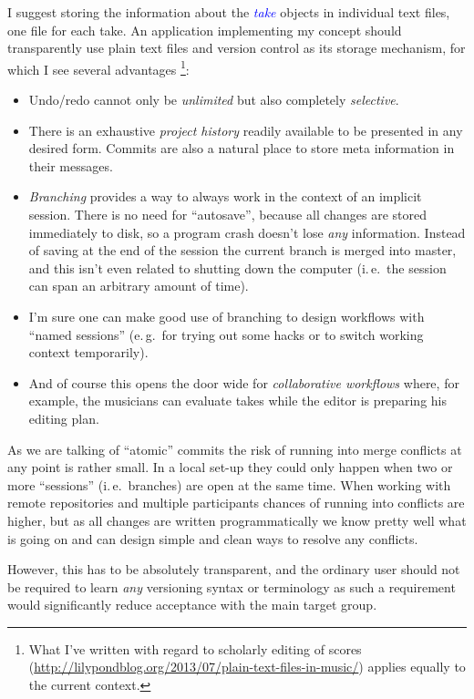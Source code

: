 \documentclass[11pt,a4paper]{article}
\newcommand*{\term}[1]{\textcolor{blue}{\emph{#1}}}
\begin{document}
I suggest storing the information about the \term{take} objects in individual
text files, one file for each take.
An application implementing my concept should transparently use plain text files
and version control as its storage mechanism, for which I see several
advantages%
\footnote{What I've written with regard to scholarly editing of scores
(\url{http://lilypondblog.org/2013/07/plain-text-files-in-music/}) applies
equally to the current context.}:
\begin{itemize}
\item Undo/redo cannot only be \emph{unlimited} but also completely
\emph{selective}.
\item There is an exhaustive \emph{project history} readily available to be
presented in any desired form.
Commits are also a natural place to store meta information in their messages.
\item \emph{Branching} provides a way to always work in the context of an
implicit session.
There is no need for “autosave”, because all changes are stored immediately to
disk, so a program crash doesn't lose \emph{any} information.
Instead of saving at the end of the session the current branch is merged into
master, and this isn't even related to shutting down the computer (i.\,e.\ the session can span an arbitrary amount of time).
\item I'm sure one can make good use of branching to design workflows with
“named sessions” (e.\,g.\ for trying out some hacks or to switch working context
temporarily).
\item And of course this opens the door wide for \emph{collaborative
workflows} where, for example, the musicians can evaluate takes while the editor
is preparing his editing plan.
\end{itemize}

As we are talking of “atomic” commits the risk of running into merge conflicts
at any point is rather small.
In a local set-up they could only happen when two or more “sessions” (i.\,e.\
branches) are open at the same time.
When working with remote repositories and multiple participants chances of
running into conflicts are higher, but as all changes are written
programmatically we know pretty well what is going on and can design simple and
clean ways to resolve any conflicts.

However, this has to be absolutely transparent, and the ordinary user should not
be required to learn \emph{any} versioning syntax or terminology as
such a requirement would significantly reduce acceptance with the main target
group.
\end{document}
